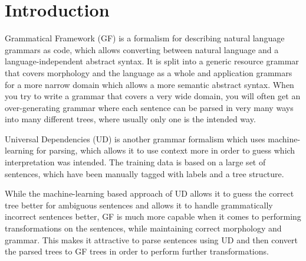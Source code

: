 \documentclass{article}
\begin{document}



\section{Introduction}


Grammatical Framework\cite{ranta-2004} (GF) is a formalism for describing natural language grammars as code, which allows converting between natural language and a language-independent abstract syntax. It is split into a generic resource grammar that covers morphology and the language as a whole and application grammars for a more narrow domain which allows a more semantic abstract syntax. When you try to write a grammar that covers a very wide domain, you will often get an over-generating grammar where each sentence can be parsed in very many ways into many different trees, where usually only one is the intended way.

Universal Dependencies\cite{mcdonald-al-2013} (UD) is another grammar formalism which uses machine-learning for parsing, which allows it to use context more in order to guess which interpretation was intended. The training data is based on a large set of sentences, which have been manually tagged with labels and a tree structure.

While the machine-learning based approach of UD allows it to guess the correct tree better for ambiguous sentences and allows it to handle grammatically incorrect sentences better, GF is much more capable when
it comes to performing transformations on the sentences, while maintaining correct morphology and grammar. This makes it attractive to parse sentences
using UD and then convert the parsed trees to GF trees in order to perform further transformations.
\end{document}
